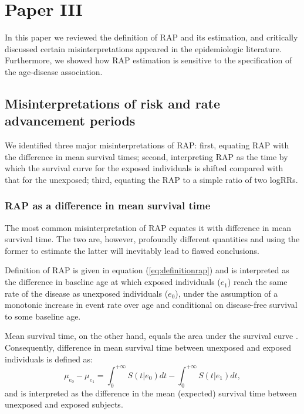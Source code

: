 %

\section{Paper III}

In this paper we reviewed the definition of RAP and its estimation,  and critically discussed certain misinterpretations appeared in the epidemiologic literature. Furthermore, we showed how RAP estimation is sensitive to the specification of the age-disease association.

\subsection{Misinterpretations of risk and rate advancement periods}

We identified three major misinterpretations of RAP: first, equating RAP with the difference in mean survival times; second, interpreting RAP as the time by which the survival curve for the exposed individuals is shifted compared with that for the unexposed; third, equating the RAP to a simple ratio of two logRRs. 

\subsubsection{RAP as a difference in mean survival time}

The most common misinterpretation of RAP equates it with difference in mean survival time. The two are, however, profoundly different quantities and using the former to estimate the latter will inevitably lead to flawed conclusions.

Definition of RAP is given in equation (\ref{eq:definitionrap}) and is interpreted as the difference in baseline age at which exposed individuals ($e_1$) reach the same rate of the disease as unexposed individuals ($e_0$), under the assumption of a monotonic increase in event rate over age and conditional on disease-free survival to some baseline age.

Mean survival time, on the other hand, equals the area under the survival curve \citep{muldowney_darth_2012}. Consequently, difference in mean survival time between unexposed and exposed individuals is defined as:
\begin{equation*}
\mu_{e_0} - \mu_{e_1} = \int_0^{+\infty} S(t|e_0) dt - \int_0^{+\infty} S(t|e_1) dt,
\end{equation*}
and is interpreted as the difference in the mean (expected) survival time between unexposed and exposed subjects.  


